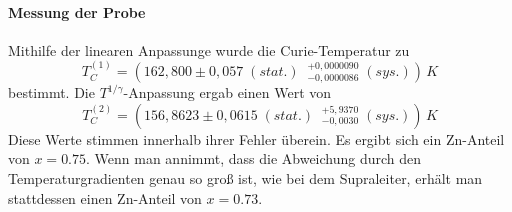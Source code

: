 \documentclass[12pt,a4paper]{article}
\begin{document}
\paragraph{Messung der Probe}
Mithilfe der linearen Anpassunge wurde die Curie-Temperatur zu \begin{equation*}
T_C^{(1)} = (162,800 \pm 0,057 \; (stat.) \; \; ^{+0,0000090}_{-0,0000086} \; (sys.)) \, \si{K}
\end{equation*}
bestimmt. Die $T^{1/\gamma}$-Anpassung ergab einen Wert von \begin{equation*}
T_C^{(2)} = (156,8623 \pm 0,0615 \; (stat.) \; \; ^{+5,9370}_{-0,0030} \; (sys.)) \, \si{K}
\end{equation*}
Diese Werte stimmen innerhalb ihrer Fehler überein. Es ergibt sich ein Zn-Anteil von $x=0.75$. Wenn man annimmt, dass die Abweichung durch den Temperaturgradienten genau so groß ist, wie bei dem Supraleiter, erhält man stattdessen einen Zn-Anteil von $x=0.73$.
\end{document}

